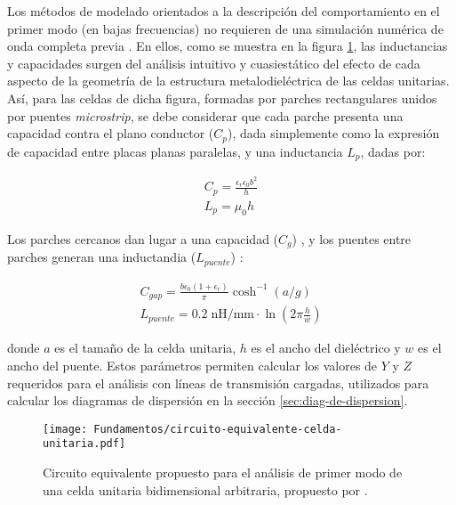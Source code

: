 Los métodos de modelado orientados a la descripción del comportamiento en el primer modo (en bajas frecuencias) no requieren de una simulación numérica de onda completa previa \cite{KimSchuttAine:AnalysisHybrid}. En ellos, como se muestra en la figura \ref{fig:circuito-equivalente-kim-parches}, las inductancias y capacidades surgen del análisis intuitivo y cuasiestático del efecto de cada aspecto de la geometría de la estructura metalodieléctrica de las celdas unitarias. Así, para las celdas de dicha figura, formadas por parches rectangulares unidos por puentes \textit{microstrip}, se debe considerar que cada parche presenta una capacidad contra el plano conductor ($C_p$), dada simplemente como la expresión de capacidad entre placas planas paralelas, y una inductancia $L_p$, dadas por:

\begin{align}
\label{eq:Cp_Lp}
C_p = \frac{\epsilon_r \epsilon_0 b^2}{h} \\
L_p = \mu_0 h
\end{align}

Los parches cercanos dan lugar a una capacidad ($C_g$) \cite{Marcela:Tesis} \cite{Sievenpiper:Thesis} \cite{KimSchuttAine:AnalysisHybrid}, y los puentes entre parches generan una inductandia ($L_{puente}$) \cite{KimSchuttAine:AnalysisHybrid}:

\begin{align}
\label{eq:cgap-y-lgap}
C_{gap} = \frac{b \epsilon_0 (1+\epsilon_r)}{\pi} \cosh^{-1} (a / g) \\
L_{puente} = 0.2\; \text{nH/mm} \cdot \ln (2\pi \frac{h}{w})
\end{align}

donde $a$ es el tamaño de la celda unitaria, $h$ es el ancho del dieléctrico y $w$ es el ancho del puente. Estos parámetros permiten calcular los valores de $Y$ y $Z$ requeridos para el análisis con líneas de transmisión cargadas, utilizados para calcular los diagramas de dispersión en la sección \ref{sec:diag-de-dispersion}.


\begin{figure}[h]
	\centering
	\texttt{[image: Fundamentos/circuito-equivalente-celda-unitaria.pdf]}
	\caption{Circuito equivalente propuesto para el análisis de primer modo de una celda unitaria bidimensional arbitraria, propuesto por \cite{KimSchuttAine:AnalysisHybrid}.}
	\label{fig:circuito-equivalente-kim-parches}
\end{figure}

